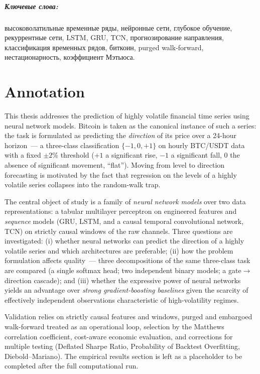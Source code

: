 \documentclass[12pt,a4paper]{report}
\begin{document}
\paragraph{Ключевые слова:} высоковолатильные временные ряды, нейронные сети,
глубокое обучение, рекуррентные сети, LSTM, GRU, TCN, прогнозирование направления,
классификация временных рядов, биткоин, purged walk-forward, нестационарность,
коэффициент Мэтьюса.

\chapter*{Annotation}

This thesis addresses the prediction of highly volatile financial time series
using neural network models. Bitcoin is taken as the canonical instance of such a
series: the task is formulated as predicting the \emph{direction} of its price over
a 24-hour horizon~--- a three-class classification $\{-1,0,+1\}$ on hourly BTC/USDT
data with a fixed $\pm 2\%$ threshold ($+1$ a significant rise, $-1$ a significant
fall, $0$ the absence of significant movement, ``flat''). Moving from level to
direction forecasting is motivated by the fact that regression on the levels of a
highly volatile series collapses into the random-walk trap.

The central object of study is a family of \emph{neural network models} over two
data representations: a tabular multilayer perceptron on engineered features and
\emph{sequence} models (GRU, LSTM, and a causal temporal convolutional network,
TCN) on strictly causal windows of the raw channels. Three questions are
investigated: (i) whether neural networks can predict the direction of a highly
volatile series and which architectures are preferable; (ii) how the problem
formulation affects quality~--- three decompositions of the same three-class task
are compared (a single softmax head; two independent binary models; a
gate$\to$direction cascade); and (iii) whether the expressive power of neural
networks yields an advantage over \emph{strong gradient-boosting baselines} given
the scarcity of effectively independent observations characteristic of
high-volatility regimes.

Validation relies on strictly causal features and windows, purged and embargoed
walk-forward treated as an operational loop, selection by the Matthews correlation
coefficient, cost-aware economic evaluation, and corrections for multiple testing
(Deflated Sharpe Ratio, Probability of Backtest Overfitting, Diebold--Mariano).
The empirical results section is left as a placeholder to be completed after the
full computational run.
\end{document}
